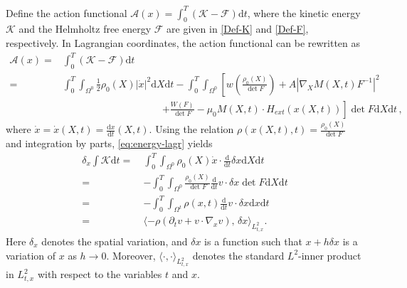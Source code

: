 \documentclass[reqno,11pt]{amsart}
\numberwithin{equation}{section}
\def\p{\partial}
\def\d{\mathrm{d}}
\def\no{\nonumber}
\newcommand{\skpt}[2]{\langle #1,\, #2 \rangle}
\begin{document}
Define the action functional $\mathcal{A} (x) = \int_0^T (\mathcal{K} - \mathcal{F}) \d t$, where the kinetic energy $\mathcal{K}$ and the Helmholtz free energy $\mathcal{F}$ are given in \eqref{Def-K} and \eqref{Def-F}, respectively. In Lagrangian coordinates, the action functional can be rewritten as
  \begin{align} \label{eq:energy-lagr}
    \no \mathcal{A} (x) = & \int_0^T (\mathcal{K} - \mathcal{F}) \d t \\ 
    = & \int_0^T \int_{\Omega^0} \tfrac{1}{2} \rho_0(X) |\dot x|^2 \d X \d t - \int_0^T \int_{\Omega^0} \left[ w \left( \frac{\rho_0(X )}{\det F} \right) + A|\nabla_X M(X,t) F^{-1}|^2 \right. \\
        \no & \qquad \qquad \qquad \qquad \qquad \left. + \frac{W(F)}{\det F} - \mu_0 M(X,t) \cdot H_{ext}(x(X,t)) \right] \det F \d X \d t \,, 
  \end{align}
  where $\dot{x} = \dot{x} (X, t) = \frac{\d x}{\d t} (X, t)$. Using the relation $\rho(x (X, t),t) = \frac{\rho_0(X) }{\det F}$ and integration by parts, \eqref{eq:energy-lagr} yields
  \begin{align}\label{eq:K-vari-x}
    \delta_x \int \mathcal{K} \d t =\ & \int_0^T \int_{\Omega^0} \rho_0(X) \dot{x} \cdot \tfrac{\d}{\d t} \delta x \d X \d t \\\no
    =\ & - \int_0^T \int_{\Omega^0} \frac{\rho_0(X) }{\det F} \tfrac{\d }{\d t} v \cdot \delta x \det F \d X \d t \\\no
    =\ & - \int_0^T \int_{\Omega^t} \rho(x,t) \tfrac{\d }{\d t} v \cdot \delta x \d x \d t \\\no
    =\ & \skpt{-\rho(\p_t v + v \cdot \nabla_x v)}{\delta x}_{L^2_{t,x}}.
  \end{align}
  Here $\delta_x$ denotes the spatial variation, and $\delta x$ is a function such that $x + h \delta x$ is a variation of $x$ as $h \to 0$.  Moreover, $\langle \cdot, \cdot \rangle_{L^2_{t,x}}$ denotes the standard $L^2$-inner product in $L^2_{t,x}$ with respect to the variables $t$ and $x$.
\end{document}
